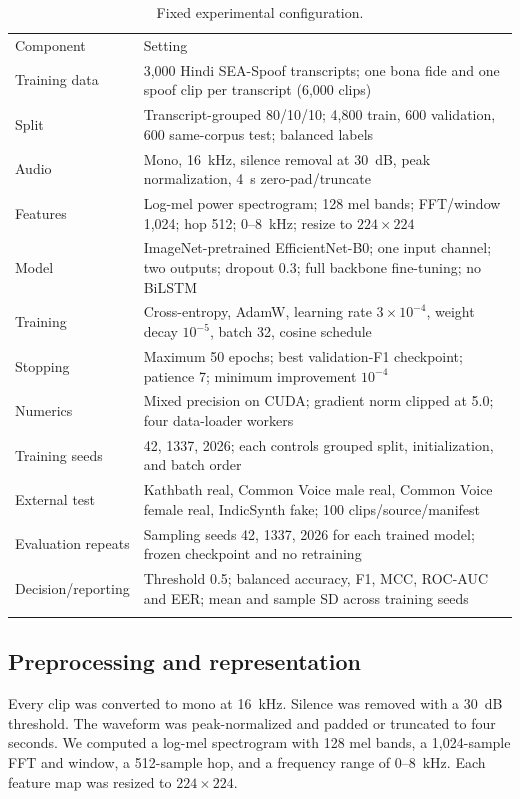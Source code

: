 \documentclass[3p,times,procedia]{elsarticle}
\begin{document}
\begin{table}[h]
\caption{Fixed experimental configuration.}
\label{tab:setup}
\small
\begin{tabular*}{\hsize}{@{\extracolsep{\fill}}lp{0.66\hsize}@{}}
\toprule
Component & Setting \\
\colrule
Training data & 3,000 Hindi SEA-Spoof transcripts; one bona fide and one spoof clip per transcript (6,000 clips) \\
Split & Transcript-grouped 80/10/10; 4,800 train, 600 validation, 600 same-corpus test; balanced labels \\
Audio & Mono, 16~kHz, silence removal at 30~dB, peak normalization, 4~s zero-pad/truncate \\
Features & Log-mel power spectrogram; 128 mel bands; FFT/window 1,024; hop 512; 0--8~kHz; resize to $224\times224$ \\
Model & ImageNet-pretrained EfficientNet-B0; one input channel; two outputs; dropout 0.3; full backbone fine-tuning; no BiLSTM \\
Training & Cross-entropy, AdamW, learning rate $3\times10^{-4}$, weight decay $10^{-5}$, batch 32, cosine schedule \\
Stopping & Maximum 50 epochs; best validation-F1 checkpoint; patience 7; minimum improvement $10^{-4}$ \\
Numerics & Mixed precision on CUDA; gradient norm clipped at 5.0; four data-loader workers \\
Training seeds & 42, 1337, 2026; each controls grouped split, initialization, and batch order \\
External test & Kathbath real, Common Voice male real, Common Voice female real, IndicSynth fake; 100 clips/source/manifest \\
Evaluation repeats & Sampling seeds 42, 1337, 2026 for each trained model; frozen checkpoint and no retraining \\
Decision/reporting & Threshold 0.5; balanced accuracy, F1, MCC, ROC-AUC and EER; mean and sample SD across training seeds \\
\botrule
\end{tabular*}
\end{table}

\subsection{Preprocessing and representation}
Every clip was converted to mono at 16~kHz. Silence was removed with a
30~dB threshold. The waveform was peak-normalized and padded or truncated
to four seconds. We computed a log-mel spectrogram with 128 mel bands, a
1,024-sample FFT and window, a 512-sample hop, and a frequency range of
0--8~kHz. Each feature map was resized to $224\times224$.
\end{document}
